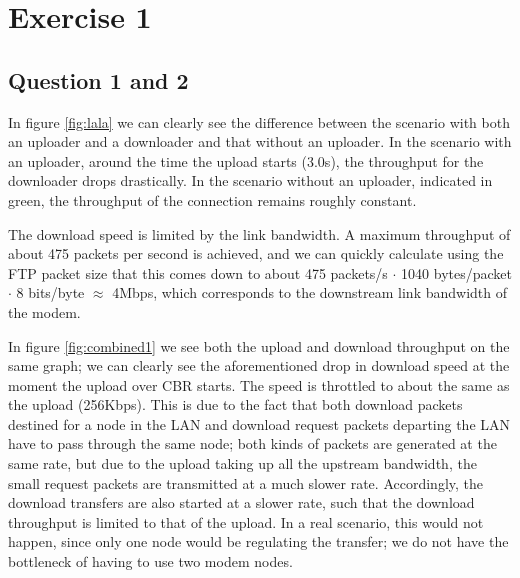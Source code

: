 \documentclass[10pt,a4paper]{article}
\begin{document}


\tableofcontents
\newpage
\section{Exercise 1}
\subsection{Question 1 and 2}
In figure \ref{fig:lala} we can clearly see the difference between the
scenario with both an uploader and a downloader and that without an
uploader. In the scenario with an uploader, around the time the upload
starts (3.0s), the throughput for the downloader drops drastically. In
the scenario without an uploader, indicated in green, the throughput
of the connection remains roughly constant.

The download speed is limited by the link bandwidth. A maximum
throughput of about 475 packets per second is achieved, and we can
quickly calculate using the FTP packet size that this comes down to
about 475 packets/s $\cdot$ 1040 bytes/packet $\cdot$ 8 bits/byte
$\approx$ 4Mbps, which corresponds to the downstream link bandwidth of
the modem.

In figure \ref{fig:combined1} we see both the upload and download
throughput on the same graph; we can clearly see the aforementioned
drop in download speed at the moment the upload over CBR starts. The
speed is throttled to about the same as the upload (256Kbps). This is
due to the fact that both download packets destined for a node in the
LAN and download request packets departing the LAN have to pass
through the same node; both kinds of packets are generated at the same
rate, but due to the upload taking up all the upstream bandwidth, the
small request packets are transmitted at a much slower
rate. Accordingly, the download transfers are also started at a slower
rate, such that the download throughput is limited to that of the
upload. In a real scenario, this would not happen, since only one node
would be regulating the transfer; we do not have the bottleneck of
having to use two modem nodes.
\end{document}
